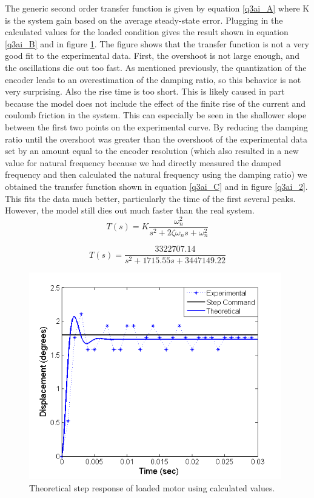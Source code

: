 \documentclass{article}
\theoremstyle{plain}
\theoremstyle{definition}
\theoremstyle{remark}
\begin{document}
The generic second order transfer function is given by equation \ref{q3ai_A} where K is the system gain based on the average steady-state error. Plugging in the calculated values for the loaded condition gives the result shown in equation \ref{q3ai_B} and in figure \ref{q3ai_1}. The figure shows that the transfer function is not a very good fit to the experimental data. First, the overshoot is not large enough, and the oscillations die out too fast. As mentioned previously, the quantization of the encoder leads to an overestimation of the damping ratio, so this behavior is not very surprising. Also the rise time is too short. This is likely caused in part because the model does not include the effect of the finite rise of the current and coulomb friction in the system. This can especially be seen in the shallower slope between the first two points on the experimental curve. By reducing the damping ratio until the overshoot was greater than the overshoot of the experimental data set by an amount equal to the encoder resolution (which also resulted in a new value for natural frequency because we had directly measured the damped frequency and then calculated the natural frequency using the damping ratio) we obtained the transfer function shown in equation \ref{q3ai_C} and in figure \ref{q3ai_2}. This fits the data much better, particularly the time of the first several peaks. However, the model still dies out much faster than the real system.\\

\begin{equation}
\label{q3ai_A}
T(s) = K \frac{\omega _n^2}{s^2 + 2\zeta \omega _n s + \omega _n^2}
\end{equation}

\begin{equation}
\label{q3ai_B}
T(s) = \frac{3322707.14}{s^2 + 1715.55 s + 3447149.22}
\end{equation}

\begin{figure}[hbt]
\begin{center}
\includegraphics[width = 11cm]{LoadedStepUnFit.png}
\caption{Theoretical step response of loaded motor using calculated values.}
\label{q3ai_1}
\end{center}
\end{figure}
\end{document}
